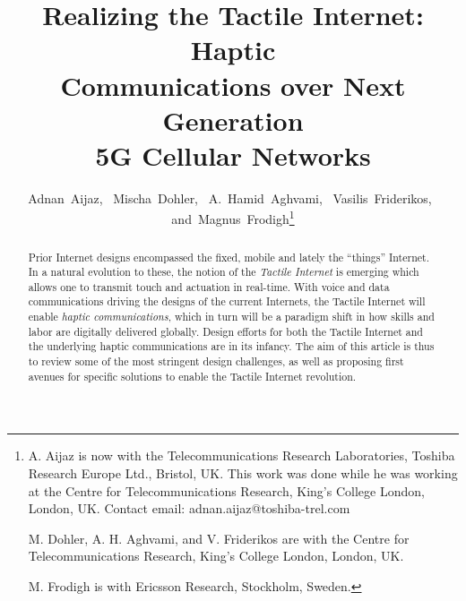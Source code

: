 \documentclass[journal]{IEEEtran}
\begin{document}
\title{Realizing the Tactile Internet: Haptic \\Communications over Next  Generation \\5G Cellular Networks}





\author{Adnan~Aijaz,~
        Mischa~Dohler,~
        A.~Hamid~Aghvami,~
        Vasilis~Friderikos,~
        and~Magnus~Frodigh\thanks{
A. Aijaz is now with the Telecommunications Research Laboratories, Toshiba Research Europe Ltd., Bristol, UK. This work was done while he was working at the Centre for Telecommunications Research, King's College London, London, UK. Contact email: adnan.aijaz@toshiba-trel.com

M. Dohler, A. H. Aghvami, and V. Friderikos are with the Centre for Telecommunications Research, King's College London, London, UK. 

M. Frodigh is with Ericsson Research, Stockholm, Sweden. 



}}



















\maketitle

\begin{abstract}
Prior Internet designs encompassed the fixed, mobile and lately the ``things'' Internet. In a natural evolution to these, the notion of the \emph{Tactile Internet} is emerging which allows one to transmit touch and actuation in real-time. With voice and data communications driving the designs of the current Internets, the Tactile Internet will enable \emph{haptic communications}, which in turn will be a paradigm shift in how skills and labor are digitally delivered globally. Design efforts for both the Tactile Internet and the underlying haptic communications  are in its infancy. The aim of this article is thus to review some of the most stringent design challenges, as well as proposing first avenues for specific solutions to enable the Tactile Internet revolution.

\end{abstract}
\end{document}
